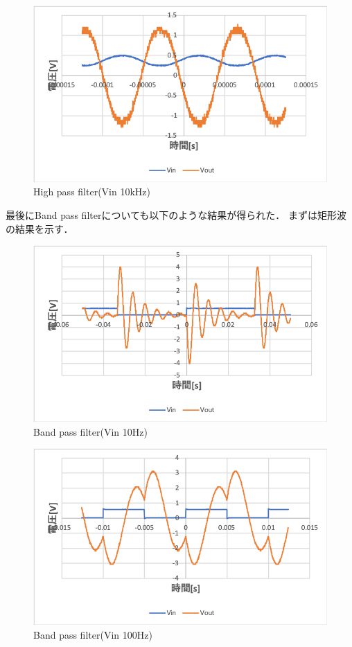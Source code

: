 \documentclass[11pt, a4paper,twocolumn]{jarticle}
\begin{document}
\begin{figure}[htbp]
 \begin{center}
  \includegraphics[width=0.8\linewidth]{fig46.png}
 \end{center}
 \caption{High pass filter(Vin 10kHz)}
 \label{fig:46}
\end{figure}

\newpage

最後にBand pass filterについても以下のような結果が得られた．
まずは矩形波の結果を示す．

\begin{figure}[htbp]
 \begin{center}
  \includegraphics[width=0.8\linewidth]{fig47.png}
 \end{center}
 \caption{Band pass filter(Vin 10Hz)}
 \label{fig:47}
\end{figure}

\begin{figure}[htbp]
 \begin{center}
  \includegraphics[width=0.8\linewidth]{fig48.png}
 \end{center}
 \caption{Band pass filter(Vin 100Hz)}
 \label{fig:48}
\end{figure}
\end{document}
